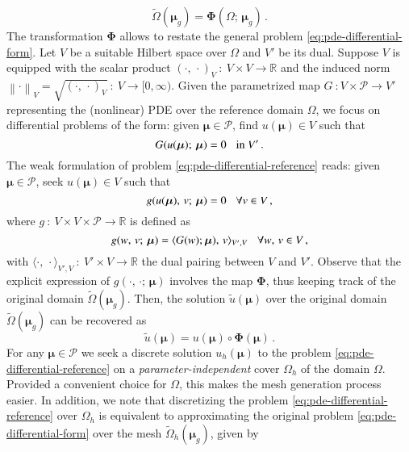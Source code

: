 \documentclass{elsarticle}
\theoremstyle{theorem}
\theoremstyle{definition}
\theoremstyle{remark}
\theoremstyle{proposition}
\numberwithin{figure}{section}
\newcommand{\norm}[1]{\left\lVert#1\right\rVert}
\newcommand{\wt}[1]{\widetilde{#1}}
\newcommand{\bg}[1]{\boldsymbol{#1}}
\begin{document}
		\begin{equation*}
			\label{eq:parametrized-map}
			\wt{\Omega}(\bg{\mu}_g) = \bg{\Phi}(\Omega; \, \bg{\mu}_g) \, .
		\end{equation*}
		The transformation $\bg{\Phi}$ allows to restate the general problem \eqref{eq:pde-differential-form}. Let $V$ be a suitable Hilbert space over $\Omega$ and $V'$ be its dual. Suppose $V$ is equipped with the scalar product $(\cdot, \, \cdot)_V ~ : ~ V \times V \rightarrow \mathbb{R}$ and the induced norm $\norm{\cdot}_V = \sqrt{(\cdot, \, \cdot)_V} ~ : ~ V \rightarrow [0,\infty)$. Given the parametrized map $G ~ : V \times \mathcal{P} \rightarrow V'$ representing the (nonlinear) PDE over the reference domain $\Omega$, we focus on differential problems of the form: given $\bg{\mu} \in \mathcal{P}$, find $u(\bg{\mu}) \in V$ such that
		\begin{equation}
			\label{eq:pde-differential-reference}
			G(u(\bg{\mu}); \, \bg{\mu}) = 0 \hspace*{0.3cm} \text{in $V'$} \, .
		\end{equation}
		The weak formulation of problem \eqref{eq:pde-differential-reference} reads: given $\bg{\mu} \in \mathcal{P}$, seek $u(\bg{\mu}) \in V$ such that
		\begin{equation}
			\label{eq:pde-weak-reference}
			g(u(\bg{\mu}), \, v; \, \bg{\mu}) = 0 \hspace*{0.3cm} \forall v \in V \, ,
		\end{equation}
		where $g ~ : ~ V \times V \times \mathcal{P} \rightarrow \mathbb{R}$ is defined as
		\begin{equation*}
			g(w, \, v; \, \bg{\mu}) = \langle G(w); \bg{\mu}), \, v \rangle_{V',V} \hspace*{0.3cm} \forall w, \, v \in V \, ,
		\end{equation*}
		with $\langle \cdot, \, \cdot \rangle_{V',V} ~ : ~ V' \times V \rightarrow \mathbb{R}$ the dual pairing between $V$ and $V'$. Observe that the explicit expression of $g(\cdot, \, \cdot; \, \bg{\mu})$ involves the map $\bg{\Phi}$, thus keeping track of the original domain $\wt{\Omega}(\bg{\mu}_g)$. Then, the solution $\wt{u}(\bg{\mu})$ over the original domain $\wt{\Omega}(\bg{\mu}_g)$ can be recovered as
		\begin{equation*}
			\wt{u}(\bg{\mu}) = u(\bg{\mu}) \circ \bg{\Phi}(\bg{\mu}) \, .
		\end{equation*}
		For any $\bg{\mu} \in \mathcal{P}$ we seek a discrete solution $u_h(\bg{\mu})$ to the problem \eqref{eq:pde-differential-reference} on a \emph{parameter-independent} cover $\Omega_h$ of the domain $\Omega$. Provided a convenient choice for $\Omega$, this makes the mesh generation process easier. In addition, we note that discretizing the problem \eqref{eq:pde-differential-reference} over $\Omega_h$ is equivalent to approximating the original problem \eqref{eq:pde-differential-form} over the mesh $\wt{\Omega}_h(\bg{\mu}_g)$, given by
\end{document}
